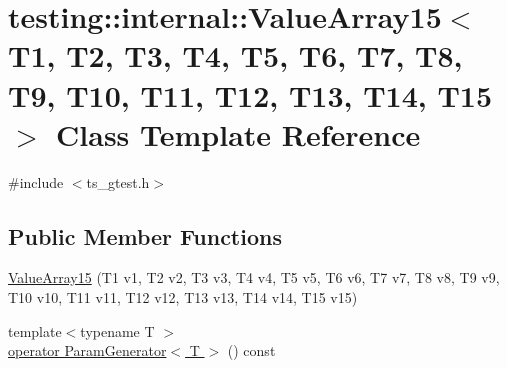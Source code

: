 \hypertarget{classtesting_1_1internal_1_1ValueArray15}{\section{testing\-:\-:internal\-:\-:Value\-Array15$<$ T1, T2, T3, T4, T5, T6, T7, T8, T9, T10, T11, T12, T13, T14, T15 $>$ Class Template Reference}
\label{classtesting_1_1internal_1_1ValueArray15}
}


{\ttfamily \#include $<$ts\-\_\-gtest.\-h$>$}

\subsection*{Public Member Functions}
\begin{DoxyCompactItemize}
\item 
\hyperlink{classtesting_1_1internal_1_1ValueArray15_a2f9c6670b744cb08587bea1b50e169b4}{Value\-Array15} (T1 v1, T2 v2, T3 v3, T4 v4, T5 v5, T6 v6, T7 v7, T8 v8, T9 v9, T10 v10, T11 v11, T12 v12, T13 v13, T14 v14, T15 v15)
\item 
{\footnotesize template$<$typename T $>$ }\\\hyperlink{classtesting_1_1internal_1_1ValueArray15_ad0d51bef2fc25806e99a6d6ef386e836}{operator Param\-Generator$<$ T $>$} () const 
\end{DoxyCompactItemize}


